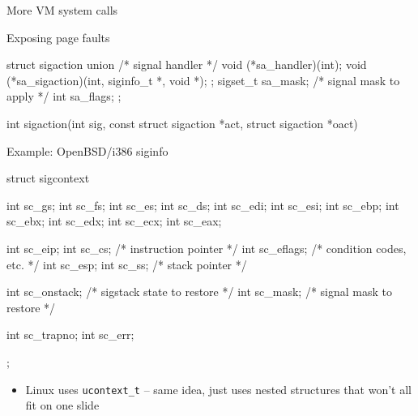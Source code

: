 \documentclass[11pt,aspectratio=169]{beamer}
\begin{document}
\begin{slide}{More VM system calls}
\end{slide}

\begin{slide}{Exposing page faults}
\begin{ccode}
  struct sigaction {
    union {               /* signal handler */
      void (*sa_handler)(int);
      void (*sa_sigaction)(int, siginfo_t *, void *);
    };
    sigset_t sa_mask;     /* signal mask to apply */
    int sa_flags;
  };

  int sigaction(int sig, const struct sigaction *act,
                struct sigaction *oact)
\end{ccode}
\end{slide}

\begin{slide}{Example:  OpenBSD/i386 siginfo}
\begin{ccode}
struct  sigcontext {
  int sc_gs; int sc_fs; int sc_es; int sc_ds;
  int sc_edi; int sc_esi; int sc_ebp; int sc_ebx; 
  int sc_edx; int sc_ecx; int sc_eax;

  int sc_eip; int sc_cs;    /* instruction pointer */
  int sc_eflags;            /* condition codes, etc. */
  int sc_esp; int sc_ss;    /* stack pointer */

  int sc_onstack;           /* sigstack state to restore */
  int sc_mask;              /* signal mask to restore */

  int sc_trapno;
  int sc_err;
};
\end{ccode}
\begin{itemize}
  \item Linux uses \texttt{ucontext\_t} -- same idea, just uses nested
    structures that won't all fit on one slide
\end{itemize}
\end{slide}
\end{document}
